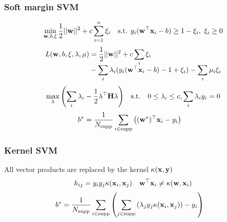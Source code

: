 \begin{mdframed}[style=eqbox]
\subsubsection{Soft margin SVM}
\vspace*{-10pt}\begin{align*}
  \min_{\mathbf{w}, b, \mathbf{\xi}} \frac{1}{2} \vert\vert \mathbf{w} \vert\vert^2 + c \sum_{i=1}^{n} \xi_i && \text{s.t. } y_i (\mathbf{w}^\top \mathbf{x}_i - b) \geq 1 - \xi_i,~ \xi_i \geq 0
\end{align*}
\vspace*{-10pt}\begin{align*}
L(\mathbf{w}, b, \mathbf{\xi}, \mathbf{\lambda}, \mathbf{\mu}) &= \frac{1}{2} \vert\vert \mathbf{w} \vert\vert^2 + c \sum_i \xi_i \\[ - 0.5em]
&- \sum_i \lambda_i (y_i (\mathbf{w}^\top \mathbf{x}_i - b) - 1 + \xi_i) - \sum_i \mu_i \xi_i
\end{align*}\vspace*{-10pt}\begin{align*}
  \max_{\mathbf{\lambda}} \left(\sum_i \lambda_i - \frac{1}{2} \mathbf{\lambda}^\top \mathbf{H} \mathbf{\lambda}\right) && \text{s.t.} \quad 0 \leq \mathbf{\lambda}_i \leq c, \sum_i \lambda_i y_i = 0
\end{align*}\vspace*{-6pt}
\begin{align*}
b^* &= \frac{1}{N_{\mathrm{supp}}} \sum_{i \in \mathrm{supp}} \left( (\mathbf{w}^*)^\top \mathbf{x}_i - y_i \right)
\end{align*}
\subsubsection{Kernel SVM}
All vector products are replaced by the kernel $\kappa(\mathbf{x},\mathbf{y})$
\vspace*{-4pt}\begin{align*}
  h_{ij} = y_iy_j \kappa(\mathbf{x}_i, \mathbf{x}_j) && \mathbf{w}^\top \mathbf{x}_i \neq \kappa(\mathbf{w}, \mathbf{x}_i)
\end{align*}\vspace*{-14pt}
\begin{align*}
b^* &= \frac{1}{N_{\mathrm{supp}}} \sum_{i \in \mathrm{supp}} \left( \sum_{j \in \mathrm{supp}} \left(\lambda_j y_j \kappa (\mathbf{x}_i, \mathbf{x}_j)\right) - y_i \right)
\end{align*}
\end{mdframed}